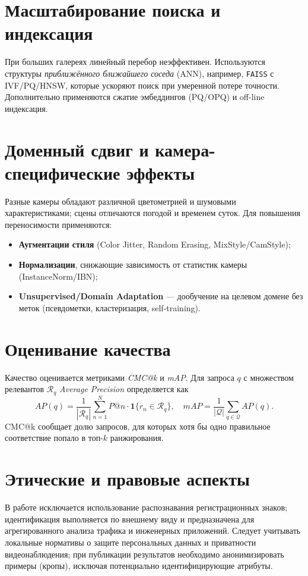 \section{Масштабирование поиска и индексация}
При больших галереях линейный перебор неэффективен. Используются структуры \emph{приближённого ближайшего соседа} (ANN), например, \texttt{FAISS} с IVF/PQ/HNSW, которые ускоряют поиск при умеренной потере точности. Дополнительно применяются сжатие эмбеддингов (PQ/OPQ) и off-line индексация.

\section{Доменный сдвиг и камера-специфические эффекты}
Разные камеры обладают различной цветометрией и шумовыми характеристиками; сцены отличаются погодой и временем суток. Для повышения переносимости применяются:
\begin{itemize}
  \item \textbf{Аугментации стиля} (Color Jitter, Random Erasing, MixStyle/CamStyle);
  \item \textbf{Нормализации}, снижающие зависимость от статистик камеры (InstanceNorm/IBN);
  \item \textbf{Unsupervised/Domain Adaptation} — дообучение на целевом домене без меток (псевдометки, кластеризация, self-training).
\end{itemize}

\section{Оценивание качества}
Качество оценивается метриками \emph{CMC@k} и \emph{mAP}. Для запроса \(q\) с множеством релевантов \(\mathcal{R}_q\) \emph{Average Precision} определяется как
\begin{equation}
AP(q) = \frac{1}{|\mathcal{R}_q|} \sum_{n=1}^{N} P@n \cdot \mathbf{1}\{r_n \in \mathcal{R}_q\}, \quad
mAP = \frac{1}{|\mathcal{Q}|} \sum_{q \in \mathcal{Q}} AP(q).
\end{equation}
CMC@k сообщает долю запросов, для которых хотя бы одно правильное соответствие попало в топ-\(k\) ранжирования.

\section{Этические и правовые аспекты}
В работе исключается использование распознавания регистрационных знаков; идентификация выполняется по внешнему виду и предназначена для агрегированного анализа трафика и инженерных приложений. Следует учитывать локальные нормативы о защите персональных данных и приватности видеонаблюдения; при публикации результатов необходимо анонимизировать примеры (кропы), исключая потенциально идентифицирующие атрибуты.

